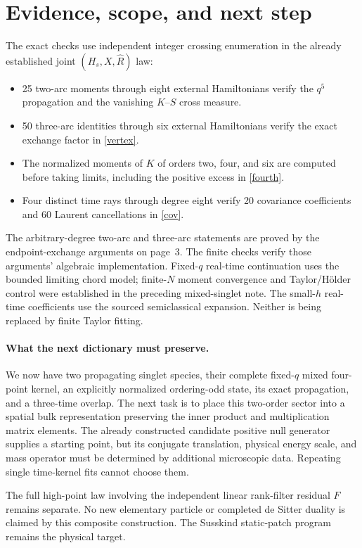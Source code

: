 \documentclass[11pt,a4paper]{article}
\newcommand{\Rh}{\widehat R}
\begin{document}
\section{Evidence, scope, and next step}
The exact checks use independent integer crossing enumeration in the
already established joint $(H_s,X,\Rh)$ law:
\begin{itemize}
\item 25 two-arc moments through eight external Hamiltonians verify
      the $q^5$ propagation and the vanishing $K$--$S$ cross measure.
\item 50 three-arc identities through six external Hamiltonians
      verify the exact exchange factor in \eqref{vertex}.
\item The normalized moments of $K$ of orders two, four, and six are
      computed before taking limits, including the positive excess in
      \eqref{fourth}.
\item Four distinct time rays through degree eight verify 20 covariance
      coefficients and 60 Laurent cancellations in \eqref{cov}.
\end{itemize}
The arbitrary-degree two-arc and three-arc statements are proved by
the endpoint-exchange arguments on page~3. The finite checks verify
those arguments' algebraic implementation. Fixed-$q$ real-time
continuation uses the bounded limiting chord model; finite-$N$ moment
convergence and Taylor/H\"older control were established in the preceding
mixed-singlet note. The small-$h$ real-time coefficients use the sourced
semiclassical expansion. Neither is being replaced by finite Taylor fitting.

\paragraph{What the next dictionary must preserve.}
We now have two propagating singlet species, their complete fixed-$q$
mixed four-point kernel, an explicitly normalized ordering-odd state,
its exact propagation, and a three-time overlap. The next task is to
place this two-order sector into a spatial bulk representation preserving
the inner product and multiplication matrix elements. The already
constructed candidate positive null generator supplies a starting
point, but its conjugate translation, physical energy scale, and mass
operator must be determined by additional microscopic data. Repeating
single time-kernel fits cannot choose them.

The full high-point law involving the independent linear rank-filter
residual $F$ remains separate. No new elementary particle or completed
de Sitter duality is claimed by this composite construction. The
Susskind static-patch program remains the physical target.
\end{document}
